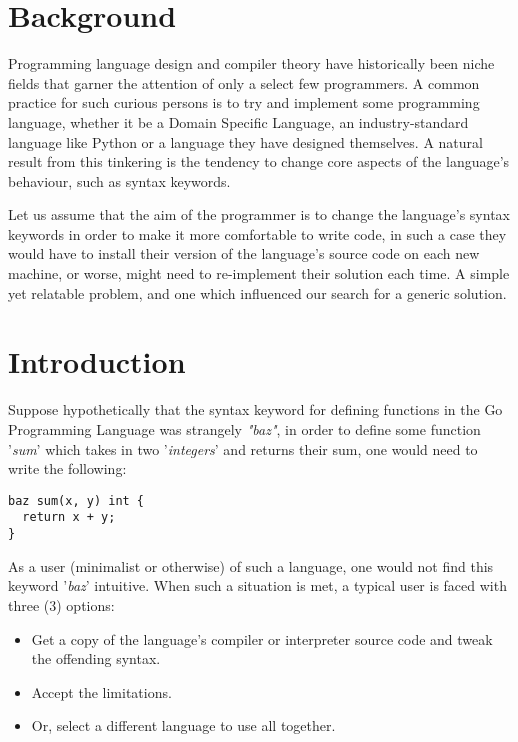 \documentclass{article}
\begin{document}
\begin{multicols}{2}

\section*{Background}

Programming language design and compiler theory have historically been niche fields that garner the attention of only a select few programmers. A common practice for such curious persons is to try and implement some programming language, whether it be a Domain Specific Language, an industry-standard language like Python \cite{Python} or a language they have designed themselves. A natural result from this tinkering is the tendency to change core aspects of the language's behaviour, such as syntax keywords.

Let us assume that the aim of the programmer is to change the language's syntax keywords in order to make it more comfortable to write code, in such a case they would have to install their version of the language's source code on each new machine, or worse, might need to re-implement their solution each time. A simple yet relatable problem, and one which influenced our search for a generic solution.

\section*{Introduction}

Suppose hypothetically that the syntax keyword for defining functions in the Go Programming Language \cite{Go} was strangely \textit{"baz"}, in order to define some function '\textit{sum}' which takes in two '\textit{integers}' and returns their sum, one would need to write the following:

\begin{verbatim}
baz sum(x, y) int {
  return x + y;
}
\end{verbatim}

As a user (minimalist or otherwise) of such a language, one would not find this keyword '\textit{baz}' intuitive. When such a situation is met, a typical user is faced with three (3) options:

\begin{itemize}
	\item Get a copy of the language's compiler or interpreter source code and tweak the offending syntax.
	\item Accept the limitations.
	\item Or, select a different language to use all together.
\end{itemize}


\end{multicols}
\end{document}
